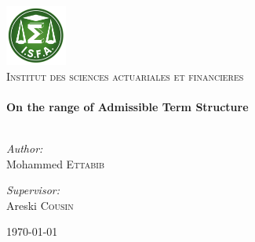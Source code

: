 \begin{titlepage}
  \begin{center}
    \includegraphics[width=0.15\textwidth]{./isfa}~\\[1cm]
    \textsc{\LARGE Institut des sciences actuariales et financieres}\\[1.5cm]
    \HRule \\[0.4cm]
{ \huge \bfseries On the range of Admissible Term Structure\\[0.4cm] }
\HRule \\[1.5cm]



\begin{minipage}{0.4\textwidth}
\begin{flushleft} \large
\emph{Author:}\\
Mohammed \textsc{Ettabib}
\end{flushleft}
\end{minipage}
\begin{minipage}{0.4\textwidth}
\begin{flushright} \large
\emph{Supervisor:} \\
Areski \textsc{Cousin}
\end{flushright}
\end{minipage}

\vfill

{\large \today}
  \end{center}
\end{titlepage}